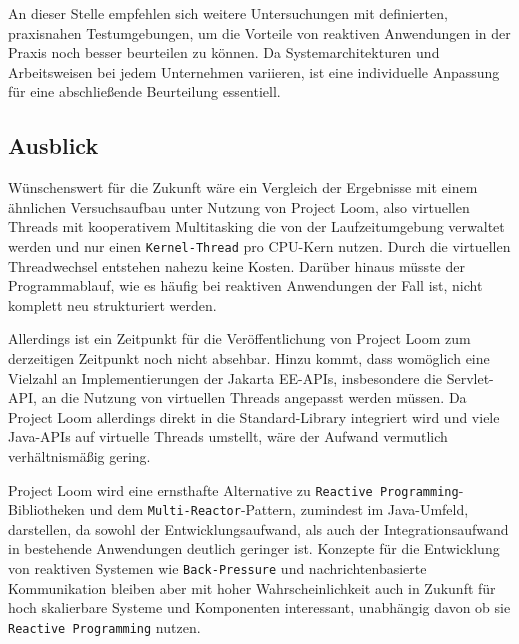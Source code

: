 An dieser Stelle empfehlen sich weitere Untersuchungen mit definierten, praxisnahen Testumgebungen, um die Vorteile
von reaktiven Anwendungen in der Praxis noch besser beurteilen zu können.
Da Systemarchitekturen und Arbeitsweisen bei jedem Unternehmen variieren, ist eine individuelle Anpassung
für eine abschließende Beurteilung essentiell.

\subsection{Ausblick}
\label{subsec:ausblick}
Wünschenswert für die Zukunft wäre ein Vergleich der Ergebnisse mit einem ähnlichen Versuchsaufbau unter Nutzung von Project Loom,
also virtuellen Threads mit kooperativem Multitasking die von der Laufzeitumgebung verwaltet werden und nur einen \verb|Kernel-Thread| pro CPU-Kern nutzen.
Durch die virtuellen Threadwechsel entstehen nahezu keine Kosten. Darüber hinaus müsste der Programmablauf, wie es häufig bei reaktiven Anwendungen
der Fall ist, nicht komplett neu strukturiert werden.

Allerdings ist ein Zeitpunkt für die Veröffentlichung von Project Loom zum derzeitigen Zeitpunkt noch nicht absehbar.
Hinzu kommt, dass womöglich eine Vielzahl an Implementierungen der Jakarta EE-APIs, insbesondere die Servlet-API,
an die Nutzung von virtuellen Threads angepasst werden müssen. Da Project Loom allerdings direkt in die Standard-Library
integriert wird und viele Java-APIs auf virtuelle Threads umstellt, wäre der Aufwand vermutlich verhältnismäßig gering.

Project Loom wird eine ernsthafte Alternative zu \verb|Reactive Programming|-Bibliotheken und dem \verb|Multi-Reactor|-Pattern, zumindest
im Java-Umfeld, darstellen, da sowohl der Entwicklungsaufwand, als auch
der Integrationsaufwand in bestehende Anwendungen deutlich geringer ist.
Konzepte für die Entwicklung von reaktiven Systemen wie \verb|Back-Pressure| und nachrichtenbasierte Kommunikation bleiben aber mit hoher
Wahrscheinlichkeit auch in Zukunft für hoch skalierbare Systeme und Komponenten interessant, unabhängig davon ob sie \verb|Reactive Programming| nutzen.